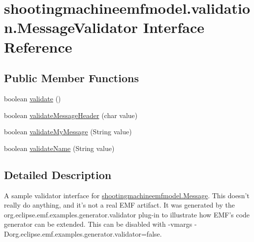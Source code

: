 \hypertarget{interfaceshootingmachineemfmodel_1_1validation_1_1_message_validator}{\section{shootingmachineemfmodel.\-validation.\-Message\-Validator Interface Reference}
\label{interfaceshootingmachineemfmodel_1_1validation_1_1_message_validator}
}
\subsection*{Public Member Functions}
\begin{DoxyCompactItemize}
\item 
boolean \hyperlink{interfaceshootingmachineemfmodel_1_1validation_1_1_message_validator_a9c58c7f9481c0501248080e52b4394ec}{validate} ()
\item 
boolean \hyperlink{interfaceshootingmachineemfmodel_1_1validation_1_1_message_validator_ad709402a1676b48dae089b733887b3cd}{validate\-Message\-Header} (char value)
\item 
boolean \hyperlink{interfaceshootingmachineemfmodel_1_1validation_1_1_message_validator_adc0d220d0af881adadfc135eeb8737de}{validate\-My\-Message} (String value)
\item 
boolean \hyperlink{interfaceshootingmachineemfmodel_1_1validation_1_1_message_validator_ac6dddcb26ae005d7769c20bb9853ab7e}{validate\-Name} (String value)
\end{DoxyCompactItemize}


\subsection{Detailed Description}
A sample validator interface for \hyperlink{interfaceshootingmachineemfmodel_1_1_message}{shootingmachineemfmodel.\-Message}. This doesn't really do anything, and it's not a real E\-M\-F artifact. It was generated by the org.\-eclipse.\-emf.\-examples.\-generator.\-validator plug-\/in to illustrate how E\-M\-F's code generator can be extended. This can be disabled with -\/vmargs -\/\-Dorg.\-eclipse.\-emf.\-examples.\-generator.\-validator=false. 

